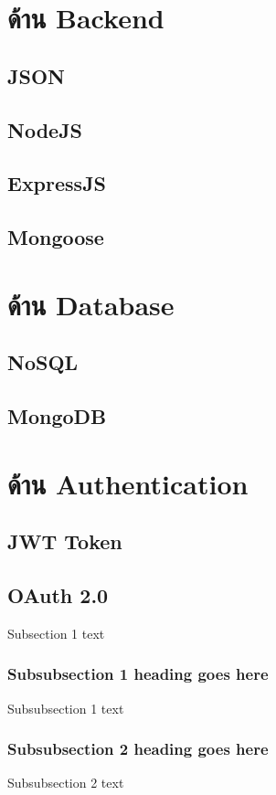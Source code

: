 \section{ด้าน Backend}
\subsection{JSON}
\subsection{NodeJS}
\subsection{ExpressJS}
\subsection{Mongoose}

\section{ด้าน Database}
\subsection{NoSQL}
\subsection{MongoDB}

\section{ด้าน Authentication}
\subsection{JWT Token}
\subsection{OAuth 2.0}
Subsection 1 text

\subsubsection{Subsubsection 1 heading goes here}
Subsubsection 1 text

\subsubsection{Subsubsection 2 heading goes here}
Subsubsection 2 text

